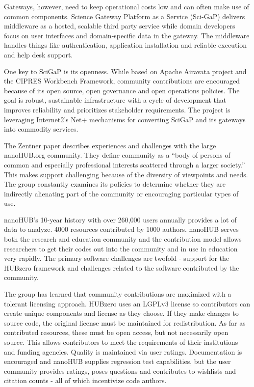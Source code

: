 \documentclass[11pt, oneside]{amsart}
\begin{document}
Gateways, however, need to keep operational costs low and can often make use of common components. Science Gateway Platform as a Service (Sci-GaP)
delivers middleware as a hosted, scalable third ­party service while domain developers focus on user interfaces and domain-specific data in the gateway.
The middleware handles things like authentication, application installation and reliable execution and help desk support.

One key to SciGaP is its openness. While based on Apache Airavata project and the CIPRES Workbench Framework, community contributions are encouraged because of its open source, open governance and open operations policies.
The goal is robust, sustainable infrastructure with a cycle of development that improves reliability and prioritizes
stakeholder requirements. The project is leveraging Internet2’s Net+ mechanisms for converting SciGaP and its gateways into commodity services.

The Zentner paper describes experiences and challenges with the large nanoHUB.org community. They define community as 
a “body of persons of common and especially professional interests scattered through a larger society.” This makes support
challenging because of the diversity of viewpoints and needs. The group constantly examines its policies to determine
whether they are indirectly alienating part of the community or encouraging particular types of use.

nanoHUB's 10-year history with over 260,000 users annually provides a lot of data to analyze. 4000 resources contributed by
1000 authors. nanoHUB serves both the research and education community and the contribution model allows researchers to get
their codes out into the community and in use in education very rapidly. The primary software challenges are twofold - support
for the HUBzero framework and challenges related to the software contributed by the community.

The group has learned that community contributions are maximized with a tolerant licensing approach. HUBzero uses an 
LGPLv3 license so contributors can create unique components and license as they choose. If they make changes to source 
code, the original license must be maintained for redistribution. As far as contributed resources, these must be open access,
but not necessarily open source. This allows contributors to meet the requirements of their institutions and funding agencies.
Quality is maintained via user ratings. Documentation is encouraged and nanoHUB supplies regression test capabilities, but 
the user community provides ratings, poses questions and contributes to wishlists and citation counts - all of which incentivize
code authors.
\end{document}
